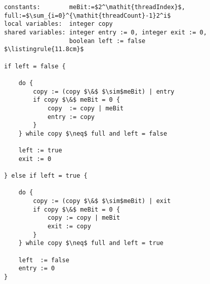 \begin{center}
\begin{minipage}{\textwidth}
\begin{lstlisting}[mathescape, linewidth=11.8cm]
constants:        meBit:=$2^\mathit{threadIndex}$, full:=$\sum_{i=0}^{\mathit{threadCount}-1}2^i$
local variables:  integer copy
shared variables: integer entry := 0, integer exit := 0,
                  boolean left := false
$\listingrule{11.8cm}$

if left = false {

	do {
		copy := (copy $\&$ $\sim$meBit) | entry
		if copy $\&$ meBit = 0 {
			copy  := copy | meBit
			entry := copy
		}
	} while copy $\neq$ full and left = false

	left := true
	exit := 0

} else if left = true {

	do {
		copy := (copy $\&$ $\sim$meBit) | exit
		if copy $\&$ meBit = 0 {
			copy := copy | meBit
			exit := copy
		}
	} while copy $\neq$ full and left = true

	left  := false
	entry := 0
}
\end{lstlisting}
\end{minipage}
\end{center}
